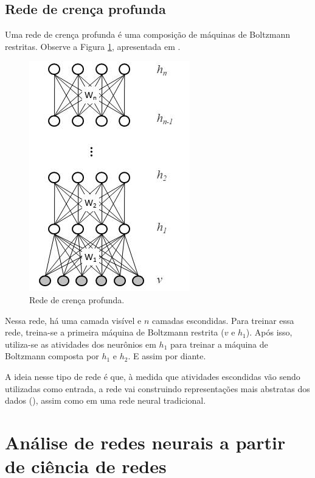 \documentclass{article}
\begin{document}
        \subsection{Rede de crença profunda}

            Uma rede de crença profunda é uma composição de máquinas de Boltzmann restritas. Observe a Figura \ref{fig4}, apresentada em \cite{testolin2018deep}.

            \begin{figure}[h!]
                \centering
                \includegraphics[scale=0.5]{Images/Deep belief network.png}
                \caption{Rede de crença profunda.}
                \label{fig4}
            \end{figure}

            Nessa rede, há uma camada visível e $n$ camadas escondidas.
            Para treinar essa rede, treina-se a primeira máquina de Boltzmann restrita ($v$ e $h_1$).
            Após isso, utiliza-se as atividades dos neurônios em $h_1$ para treinar a máquina de Boltzmann composta por $h_1$ e $h_2$.
            E assim por diante.

            A ideia nesse tipo de rede é que, à medida que atividades escondidas vão sendo utilizadas como entrada, a rede vai construindo representações mais abstratas dos dados (\cite{testolin2018deep}), assim como em uma rede neural tradicional.

    \section{Análise de redes neurais a partir de ciência de redes}
\end{document}
